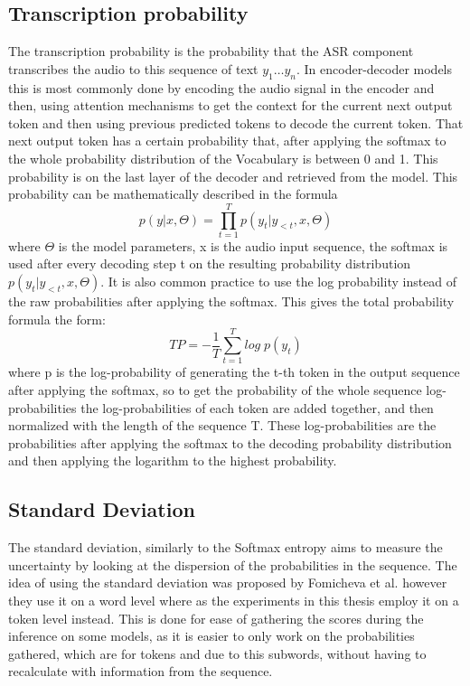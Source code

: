 \subsection{Transcription probability}
The transcription probability is the probability that the ASR component transcribes the audio to this sequence of text $y_1\dots y_n$. 
In encoder-decoder models this is most commonly done by encoding the audio signal in the encoder and then, using attention mechanisms to get the context for the current next output token and then using previous predicted tokens to decode the current token. 
That next output token has a certain probability that, after applying the softmax to the whole probability distribution of the Vocabulary is between 0 and 1. This probability is on the last layer of the decoder and retrieved from the model. 
This probability can be mathematically described in the formula $$p(y|x,\Theta)=\prod_{t=1}^T p(y_t|y_{<t}, x, \Theta) $$ where $\Theta$ is the model parameters, x is the audio input sequence, the softmax is used after every decoding step t on the resulting probability distribution $p(y_t|y_{<t}, x,\Theta)$. 
It is also common practice to use the log probability instead of the raw probabilities after applying the softmax. This gives the total probability formula the form: $$TP=-\frac{1}{T}\sum_{t=1}^T log\; p(y_t) \label{formula:transcriptionProbability}$$
where p is the log-probability of generating the t-th token in the output sequence after applying the softmax, so to get the probability of the whole sequence log-probabilities the log-probabilities of each token are added together, and then normalized with the length of the sequence T. 
These log-probabilities are the probabilities after applying the softmax to the decoding probability distribution and then applying the logarithm to the highest probability.


\subsection{Standard Deviation}\label{sect:stddiv}
The standard deviation, similarly to the Softmax entropy aims to measure the uncertainty by looking at the dispersion of the probabilities in the sequence. 
The idea of using the standard deviation was proposed by Fomicheva et al. however they use it on a word level where as the experiments in this thesis employ it on a token level instead. 
This is done for ease of gathering the scores during the inference on some models, as it is easier to only work on the probabilities gathered, which are for tokens and due to this subwords, without having to recalculate with information from the sequence. 


